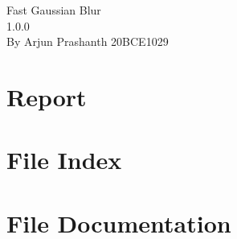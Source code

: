 \documentclass[twoside]{book}
\newcommand{\+}{\discretionary{\mbox{\scriptsize$\hookleftarrow$}}{}{}}
\newcommand{\clearemptydoublepage}{%
	\newpage{\pagestyle{empty}\cleardoublepage}%
}
\begin{document}
\raggedbottom
\hypersetup{pageanchor=false,
	bookmarksnumbered=true,
	pdfencoding=unicode
}
\begin{titlepage}
	\vspace*{7cm}
	\begin{center}%
		{\Large Fast Gaussian Blur}\\
		[1ex]\large 1.\+0.\+0 \\
		\vspace*{1cm}
		{\large By Arjun Prashanth 20BCE1029 }\\
	\end{center}
\end{titlepage}
\clearemptydoublepage
{}
\tableofcontents
\clearemptydoublepage
{}
\hypersetup{pageanchor=true}
\chapter{Report}
\label{md_Report}

\chapter{File Index}

\chapter{File Documentation}




\backmatter
\newpage
{}
\clearemptydoublepage
{}
\printindex
\end{document}
